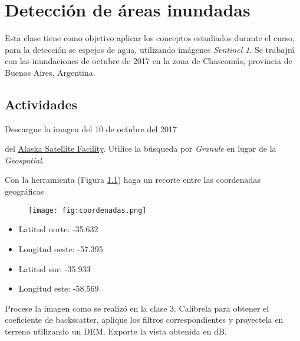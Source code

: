 \chapter{Detección de áreas inundadas}

Esta clase tiene como objetivo aplicar los conceptos estudiados durante el curso, para la detección se espejos de agua, utilizando imágenes \emph{Sentinel 1}. Se trabajrá con las inundaciones de octubre de 2017 en la zona de Chascomús, provincia de Buenos Aires, Argentina.



\section{Actividades}

\begin{que}
    Descargue la imagen del 10 de octubre del 2017
    \begin{center}\end{center} del \href{https://vertex.daac.asf.alaska.edu/}{Alaska Satellite Facility}. Utilice la búsqueda por \emph{Granule} en lugar de la \emph{Geospatial}.
\end{que}

\begin{que}
    Con la herramienta  (Figura \ref{fig:coordenadas}) haga un recorte entre las coordenadas geográficas
    \begin{figure}[h!]
        \centering
        \texttt{[image: fig:coordenadas.png]}
        \caption{}
        \label{fig:coordenadas}
    \end{figure}
    \begin{itemize}
        \item Latitud norte: -35.632
        \item Longitud oeste: -57.395
        \item Latitud sur: -35.933
        \item Longitud este: -58.569
    \end{itemize}


\end{que}

\begin{que}
    Procese la imagen como se realizó en la clase 3. Calíbrela para obtener el coeficiente de backscatter, aplique los filtros correspondientes y proyectela en terreno utilizando un DEM. Exporte la vista obtenida en dB.
\end{que}

